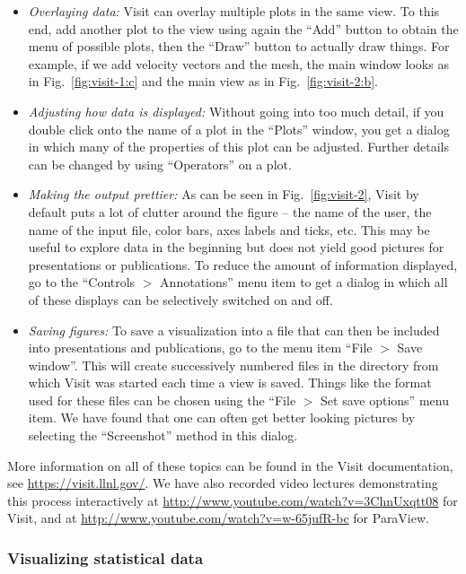 \documentclass{article}
\begin{document}
\begin{itemize}
\item \textit{Overlaying data:} Visit can overlay multiple plots in the same
  view. To this end, add another plot to the view using again the ``Add''
  button to obtain the menu of possible plots, then the ``Draw'' button to
  actually draw things. For example, if we add velocity vectors and the mesh,
  the main window looks as in Fig.~\ref{fig:visit-1:c} and the main view as in
  Fig.~\ref{fig:visit-2:b}.

\item \textit{Adjusting how data is displayed:} Without going into too much
  detail, if you double click onto the name of a plot in the ``Plots'' window,
  you get a dialog in which many of the properties of this plot can be
  adjusted. Further details can be changed by using ``Operators'' on a plot.

\item \textit{Making the output prettier:} As can be seen in
  Fig.~\ref{fig:visit-2}, Visit by default puts a lot of clutter around the
  figure -- the name of the user, the name of the input file, color bars, axes
  labels and ticks, etc. This may be useful to explore data in the beginning
  but does not yield good pictures for presentations or publications. To
  reduce the amount of information displayed, go to the ``Controls $>$
  Annotations'' menu item to get a dialog in which all of these displays can
  be selectively switched on and off.

\item \textit{Saving figures:} To save a visualization into a file that can
  then be included into presentations and publications, go to the menu item
  ``File $>$ Save window''. This will create successively numbered files in
  the directory from which Visit was started each time a view is saved. Things
  like the format used for these files can be chosen using the ``File $>$ Set
  save options'' menu item. We have found that one can often get better
  looking pictures by selecting the ``Screenshot'' method in this dialog.
\end{itemize}

More information on all of these topics can be found in the Visit
documentation, see \url{https://visit.llnl.gov/}. We have also recorded
video lectures demonstrating this process interactively at
\url{http://www.youtube.com/watch?v=3ChnUxqtt08} for Visit, and at
\url{http://www.youtube.com/watch?v=w-65jufR-bc} for ParaView.


\subsubsection{Visualizing statistical data}
\label{sec:viz-stat}
\end{document}
